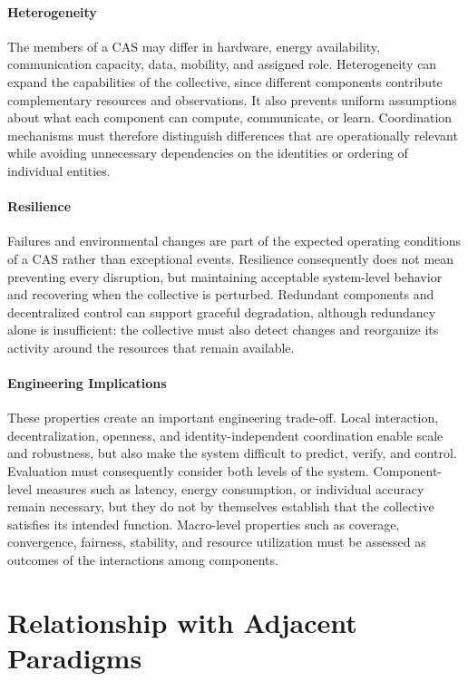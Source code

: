 \paragraph{Heterogeneity}
The members of a \gls{CAS} may differ in hardware, energy availability,
 communication capacity, data, mobility, and assigned role.
%
Heterogeneity can expand the capabilities of the collective, since different
 components contribute complementary resources and observations.
%
It also prevents uniform assumptions about what each component can compute,
 communicate, or learn.
%
Coordination mechanisms must therefore distinguish differences that are
 operationally relevant while avoiding unnecessary dependencies on the
 identities or ordering of individual entities.

\paragraph{Resilience}
Failures and environmental changes are part of the expected operating
 conditions of a \gls{CAS} rather than exceptional events.
%
Resilience consequently does not mean preventing every disruption, but
 maintaining acceptable system-level behavior and recovering when the
 collective is perturbed.
%
Redundant components and decentralized control can support graceful
 degradation, although redundancy alone is insufficient:
 the collective must also detect changes and reorganize its activity around
 the resources that remain available.

\paragraph{Engineering Implications}
These properties create an important engineering trade-off.
%
Local interaction, decentralization, openness, and identity-independent
 coordination enable scale and robustness, but also make the system difficult
 to predict, verify, and control.
%
Evaluation must consequently consider both levels of the system.
%
Component-level measures such as latency, energy consumption, or individual
 accuracy remain necessary, but they do not by themselves establish that the
 collective satisfies its intended function.
%
Macro-level properties such as coverage, convergence, fairness, stability,
 and resource utilization must be assessed as outcomes of the interactions
 among components.

\section{Relationship with Adjacent Paradigms}
\label{subsec:cas-related-paradigms}

